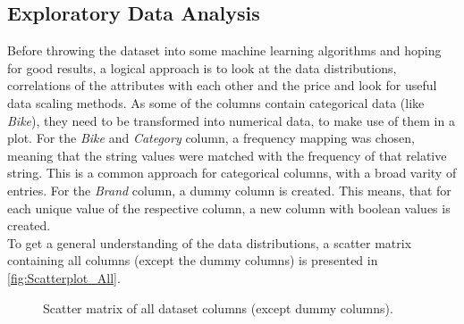 \subsection{Exploratory Data Analysis}
\label{sec:Expl}
Before throwing the dataset into some machine learning algorithms and hoping for good results, a logical approach is to look at 
the data distributions, correlations of the attributes with each other and the price and look for useful data scaling methods.
As some of the columns contain categorical data (like \textit{Bike}), they need to be transformed into numerical 
data, to make use of them in a plot. For the \textit{Bike} and \textit{Category} column, a frequency mapping was chosen, meaning
that the string values were matched with the frequency of that relative string. This is a common approach for categorical columns,
with a broad varity of entries. For the \textit{Brand} column, a dummy column is created. This means,
that for each unique value of the respective column, a new column with boolean values is created. \\
To get a general understanding of the data distributions, a scatter matrix containing all columns (except the dummy columns) 
is presented in \autoref{fig:Scatterplot_All}.
\begin{figure}[h]
    \centering
        \caption{Scatter matrix of all dataset columns (except dummy columns).}
        \label{fig:Scatterplot_All}
\end{figure}
